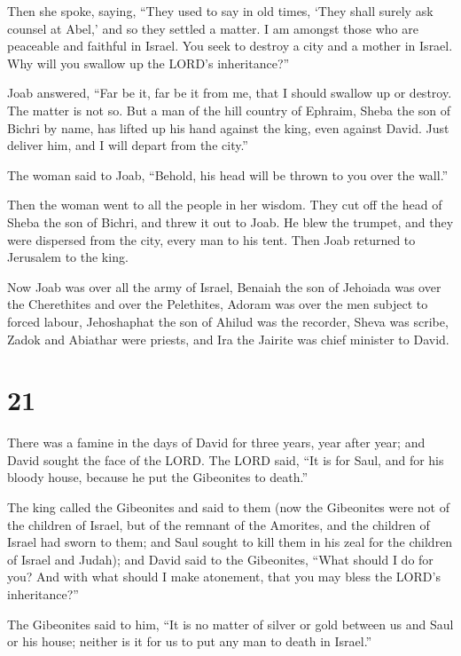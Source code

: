  Then she spoke, saying, ``They used to say in old times,
`They shall surely ask counsel at Abel,' and so they settled a matter.
 I am amongst those who are peaceable and faithful in
Israel. You seek to destroy a city and a mother in Israel. Why will you
swallow up the LORD's inheritance?''

 Joab answered, ``Far be it, far be it from me, that I
should swallow up or destroy.  The matter is not so. But a
man of the hill country of Ephraim, Sheba the son of Bichri by name, has
lifted up his hand against the king, even against David. Just deliver
him, and I will depart from the city.''

The woman said to Joab, ``Behold, his head will be thrown to you over
the wall.''

 Then the woman went to all the people in her wisdom. They
cut off the head of Sheba the son of Bichri, and threw it out to Joab.
He blew the trumpet, and they were dispersed from the city, every man to
his tent. Then Joab returned to Jerusalem to the king.

 Now Joab was over all the army of Israel, Benaiah the son
of Jehoiada was over the Cherethites and over the Pelethites,
 Adoram was over the men subject to forced labour,
Jehoshaphat the son of Ahilud was the recorder,  Sheva was
scribe, Zadok and Abiathar were priests,  and Ira the
Jairite was chief minister to David.

\hypertarget{section-20}{%
\section{21}\label{section-20}}

 There was a famine in the days of David for three years,
year after year; and David sought the face of the LORD. The LORD said,
``It is for Saul, and for his bloody house, because he put the
Gibeonites to death.''

 The king called the Gibeonites and said to them (now the
Gibeonites were not of the children of Israel, but of the remnant of the
Amorites, and the children of Israel had sworn to them; and Saul sought
to kill them in his zeal for the children of Israel and Judah);
 and David said to the Gibeonites, ``What should I do for
you? And with what should I make atonement, that you may bless the
LORD's inheritance?''

 The Gibeonites said to him, ``It is no matter of silver or
gold between us and Saul or his house; neither is it for us to put any
man to death in Israel.''

